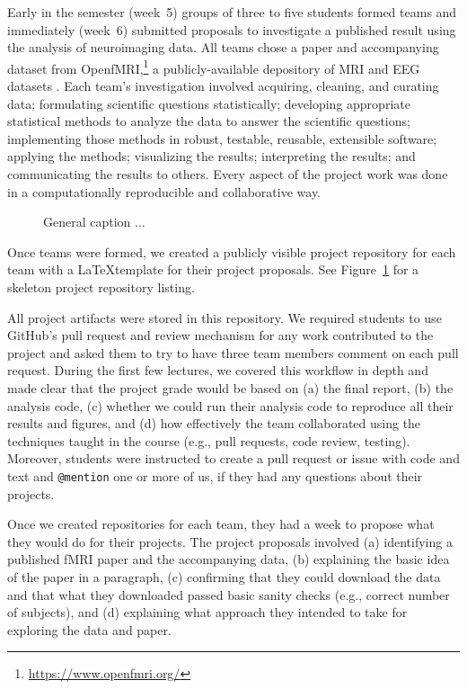 Early in the semester (week~5) groups of three to five students formed teams
and immediately (week~6) submitted proposals to investigate
a published result using the analysis of neuroimaging data.
All teams chose a paper and accompanying dataset from
OpenfMRI,\footnote{\url{https://www.openfmri.org/}} a publicly-available
depository of MRI and EEG datasets
\citep{poldrack2013toward,poldrack2015openfmri}.
Each team's investigation involved
acquiring, cleaning, and curating data;
formulating scientific questions statistically;
developing appropriate statistical methods
to analyze the data to answer the scientific questions;
implementing those methods in robust, testable, reusable, extensible software;
applying the methods;
visualizing the results;
interpreting the results;
and communicating the results to others.
Every aspect of the project work was done in a computationally reproducible
and collaborative way.

\begin{figure}
\centering

\caption{General caption ...}
\label{fig:repo}
\end{figure}

Once teams were formed, we created a publicly visible project repository for
each team with a \LaTeX template for their project proposals.
See Figure~\ref{fig:repo} for a skeleton project repository listing.

All project artifacts were stored in this repository.
We required students to use GitHub's pull request and review mechanism
for any work contributed to the project and asked them to try to have
three team members comment on each pull request.
During the first few lectures, we covered this workflow in depth
and made clear that the project grade would be based on
(a) the final report,
(b) the analysis code,
(c) whether we could run their analysis code to reproduce all
their results and figures, and
(d) how effectively the team collaborated using the techniques
taught in the course (e.g., pull requests, code review, testing).
Moreover, students were instructed to create a pull request
or issue with code and text and \texttt{@mention} one or more of us,
if they had any questions about their projects.

Once we created repositories for each team, they had a week to propose what
they would do for their projects.
The project proposals involved
(a) identifying a published fMRI paper and the accompanying data,
(b) explaining the basic idea of the paper in a paragraph,
(c) confirming that they could download the data and that what they
downloaded passed basic sanity checks (e.g., correct number of subjects), and
(d) explaining what approach they intended to take for exploring
the data and paper.

